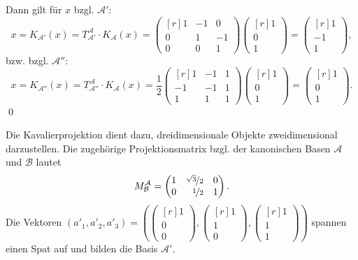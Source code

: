 \documentclass[answers]{exam}
\newcommand{\vektor}[1]{\begin{pmatrix*}[r] #1 \end{pmatrix*}}
\newcommand{\A}{\mathcal{A}}
\newcommand{\B}{\mathcal{B}}
\begin{document}
\begin{questions}
\begin{parts}
\begin{solution}
            Dann gilt für $x$ bzgl. $\A'$:
            $$
                x = K_{\A'}(x) = T^{\A}_{\A'} \cdot K_{\A}(x) = \vektor{1 & -1 & 0 \\ 0 & 1 & -1 \\ 0 & 0 & 1} \vektor{1 \\ 0 \\ 1} = \vektor{1 \\ -1 \\ 1},
            $$
            bzw. bzgl. $\A''$:
            $$
                x = K_{\A''}(x) = T^{\A}_{\A''} \cdot K_{\A}(x) = \frac{1}{2}\vektor{1 & -1 & 1 \\ -1 & -1 & 1 \\ 1 & 1 & 1} \vektor{1 \\ 0 \\ 1} = \vektor{1 \\ 0 \\ 1}.
            $$\qed
        \end{solution}

    \end{parts}

    \newpage
    \question
    Die Kavalierprojektion dient dazu, dreidimensionale Objekte zweidimensional darzustellen.
    Die zugehörige Projektionsmatrix bzgl. der kanonischen Basen $\A$ und $\B$ lautet
    $$
        M^\A_\B = \vektor{1 & \nicefrac{\sqrt{3}}{2} & 0 \\ 0 & \nicefrac{1}{2} & 1}.
    $$
    Die Vektoren $(a'_1, a'_2, a'_3) = \left(\vektor{1 \\ 0 \\ 0}, \vektor{1 \\ 1 \\ 0}, \vektor{1 \\ 1 \\ 1}\right)$ spannen einen Spat auf und bilden die Basis $\A'$.
\end{questions}
\end{document}
